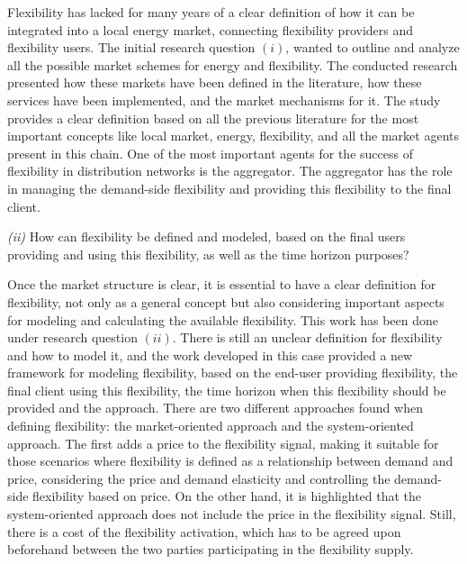 Flexibility has lacked for many years of a clear definition of how it can be integrated into a local energy market, connecting flexibility providers and flexibility users. The initial research question $(i)$, wanted to outline and analyze all the possible market schemes for energy and flexibility. The conducted research presented how these markets have been defined in the literature, how these services have been implemented, and the market mechanisms for it. The study provides a clear definition based on all the previous literature for the most important concepts like local market, energy, flexibility, and all the market agents present in this chain. One of the most important agents for the success of flexibility in distribution networks is the aggregator. The aggregator has the role in managing the demand-side flexibility and providing this flexibility to the final client.

\begin{tcolorbox}

\textit{(ii)} How can flexibility be defined and modeled, based on the final users providing and using this flexibility, as well as the time horizon purposes? 

\end{tcolorbox}
Once the market structure is clear, it is essential to have a clear definition for flexibility, not only as a general concept but also considering important aspects for modeling and calculating the available flexibility. This work has been done under research question $(ii)$. There is still an unclear definition for flexibility and how to model it, and the work developed in this case provided a new framework for modeling flexibility, based on the end-user providing flexibility, the final client using this flexibility, the time horizon when this flexibility should be provided and the approach. There are two different approaches found when defining flexibility: the market-oriented approach and the system-oriented approach. The first adds a price to the flexibility signal, making it suitable for those scenarios where flexibility is defined as a relationship between demand and price, considering the price and demand elasticity and controlling the demand-side flexibility based on price. On the other hand, it is highlighted that the system-oriented approach does not include the price in the flexibility signal. Still, there is a cost of the flexibility activation, which has to be agreed upon beforehand between the two parties participating in the flexibility supply. 

